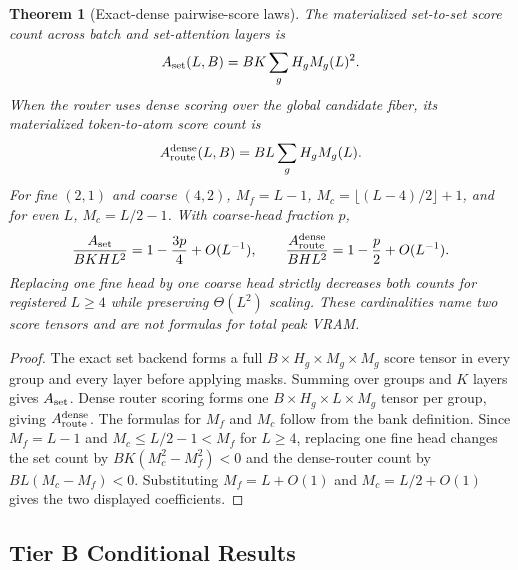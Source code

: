 \documentclass{article}
\theoremstyle{plain}
\newtheorem{theorem}{Theorem}[section]
\theoremstyle{definition}
\theoremstyle{remark}
\begin{document}
\begin{theorem}[Exact-dense pairwise-score laws]
\label{thm:exact-dense-score-memory}
The materialized set-to-set score count across batch and set-attention layers is
\begin{equation}
A_{\rm set}(L,B)=BK\sum_gH_gM_g(L)^2.
\end{equation}
When the router uses dense scoring over the global candidate fiber, its
materialized token-to-atom score count is
\begin{equation}
A_{\rm route}^{\rm dense}(L,B)=BL\sum_gH_gM_g(L).
\end{equation}
For fine $(2,1)$ and coarse $(4,2)$, $M_f=L-1$, $M_c=\lfloor(L-4)/2\rfloor+1$, and for even $L$, $M_c=L/2-1$.  With coarse-head fraction $p$,
\begin{equation}
\frac{A_{\rm set}}{BKHL^2}=1-\frac{3p}{4}+O(L^{-1}),
\qquad
\frac{A_{\rm route}^{\rm dense}}{BHL^2}=1-\frac{p}{2}+O(L^{-1}).
\end{equation}
Replacing one fine head by one coarse head strictly decreases both counts for
registered $L\ge4$ while preserving $\Theta(L^2)$ scaling.  These cardinalities
name two score tensors and are not formulas for total peak VRAM.
\end{theorem}
\begin{proof}
The exact set backend forms a full
$B\times H_g\times M_g\times M_g$ score tensor in every group and every layer
before applying masks.  Summing over groups and $K$ layers gives
$A_{\rm set}$.  Dense router scoring forms one
$B\times H_g\times L\times M_g$ tensor per group, giving
$A_{\rm route}^{\rm dense}$.  The formulas for $M_f$ and $M_c$ follow from the
bank definition.  Since $M_f=L-1$ and $M_c\le L/2-1<M_f$ for $L\ge4$,
replacing one fine head changes the set count by
$BK(M_c^2-M_f^2)<0$ and the dense-router count by
$BL(M_c-M_f)<0$.  Substituting $M_f=L+O(1)$ and
$M_c=L/2+O(1)$ gives the two displayed coefficients.
\end{proof}

\subsection{Tier B Conditional Results}
\label{sec:mrp6-tier-b}
\end{document}
